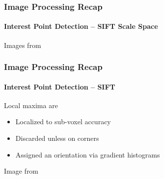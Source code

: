 \documentclass[xetex,professionalfont]{beamer}
\begin{document}

\begin{frame}
\frametitle{Image Processing Recap}
\framesubtitle{Interest Point Detection -- SIFT Scale Space}

\begin{center}
    {\centering Images from \cite{prince12}}
\end{center}

\end{frame}


\begin{frame}
\frametitle{Image Processing Recap}
\framesubtitle{Interest Point Detection -- SIFT}

Local maxima are
\begin{itemize}
    \item Localized to sub-voxel accuracy %
    \item Discarded unless on corners %
    \item Assigned an orientation via gradient histograms %
\end{itemize}

\begin{center}
    {\centering Image from \cite{prince12}}
\end{center}

\end{frame}
\end{document}
